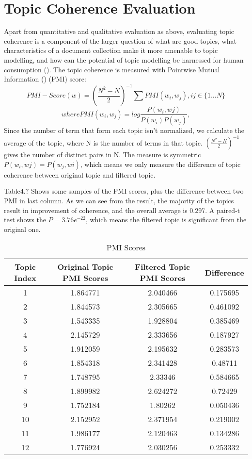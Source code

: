 \documentclass[11pt,twoside]{report}
\begin{document}
\section{Topic Coherence Evaluation}
Apart from quantitative and qualitative evaluation as above, evaluating topic coherence is a component of the larger question of what are good topics, what characteristics of a document collection make it more amenable to topic modelling, and how can the potential of topic modelling be harnessed for human consumption (\cite{ref27}). The topic coherence is measured with Pointwise Mutual Information (\cite{ref32}) (PMI) score:
\begin{equation}
PMI-Score(w) = (\frac{N^{2}-N}{2})^{-1}\sum PMI(w_{i}, w_{j}), ij\in \{1...N\}
\end{equation}
\begin{equation}
where PMI(w_{i}, w_{j}) = log \frac{P(w_{i}, w{j})}{P(w_{i})P(w_{j})},
\end{equation}
Since the number of term that form each topic isn't normalized, we calculate the average of the topic, where N is the number of terms in that topic. $(\frac{N^{2}-N}{2})^{-1}$ gives the number of distinct pairs in N.
The measure is symmetric $P(w_{i}, w{j}) = P(w_{j}, w{i})$, which means we only measure the difference of topic coherence between original topic and filtered topic.

Table4.? Shows some samples of the PMI scores, plus the difference between two PMI in last column. As we can see from the result, the majority of the topics result in improvement of coherence, and the overall average is 0.297. A paired-t test shows the $P=3.76e^{-22}$, which means the filtered topic is significant from the original one.

\begin{table}[h]
\caption{PMI Scores}
\centering
\begin{tabular}{c c c c}
\hline\hline
Topic Index & Original Topic PMI Scores & Filtered Topic PMI Scores & Difference\\
\hline
1 & 1.864771 & 2.040466 & 0.175695\\
2 & 1.844573 & 2.305665 & 0.461092\\
3 & 1.543335 & 1.928804 & 0.385469\\
4 & 2.145729 & 2.333656 & 0.187927\\
5 & 1.912059 & 2.195632 & 0.283573\\
6 & 1.854318 & 2.341428 & 0.48711\\
7 & 1.748795 & 2.33346 & 0.584665\\
8 & 1.899982 & 2.624272 & 0.72429\\
9 & 1.752184 & 1.80262 & 0.050436\\
10 & 2.152952 & 2.371954 & 0.219002\\
11 & 1.986177 & 2.120463 & 0.134286\\
12 & 1.776924 & 2.030256 & 0.253332\\
\hline
\end{tabular}
\label{table:PMI Scores}
\end{table}
\end{document}
